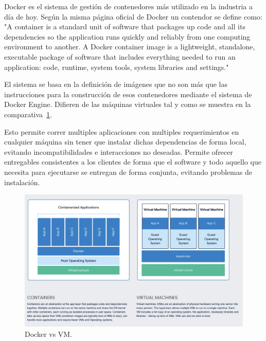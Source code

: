 
Docker es el sistema de gestión de contenedores más utilizado en la industria a día de hoy. Según la misma página oficial de Docker un contendor se define como: "A container is a standard unit of software that packages up code and all its dependencies so the application runs quickly and reliably from one computing environment to another. A Docker container image is a lightweight, standalone, executable package of software that includes everything needed to run an application: code, runtime, system tools, system libraries and settings." \cite{docker}

El sistema se basa en la definición de imágenes que no son más que las instrucciones para la construcción de esos contenedores mediante el sistema de Docker Engine. Difieren de las máquinas virtuales tal y como se muestra en la comparativa~\cref{fig:Docker vs VM}.

Esto permite correr multiples aplicaciones con multiples requerimientos en cualquier máquina sin tener que instalar dichas dependencias de forma local, evitando incompatibilidades e interacciones no deseadas. Permite ofrecer entregables consistentes a los clientes de forma que el software y todo aquello que necesita para ejecutarse se entregan de forma conjunta, evitando problemas de instalación.

\begin{figure}[H]
    \centering
    \includegraphics[height=0.3\textheight]{./part/Proyecto_ejecutivo/memoria_constructiva/docker/img/dockerVsVM}
    \caption{Docker vs VM.\cite{docker}}\label{fig:Docker vs VM}
\end{figure}

